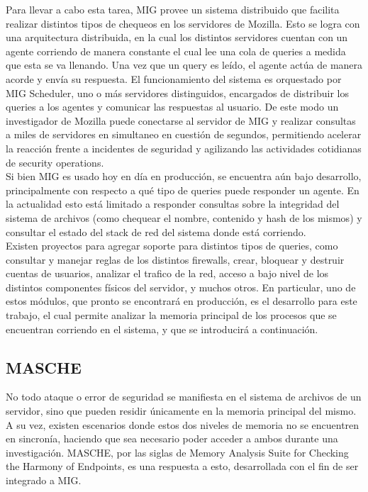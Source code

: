 Para llevar a cabo esta tarea, MIG provee un sistema distribuido que facilita
realizar distintos tipos de chequeos en los servidores de Mozilla. Esto se
logra con una arquitectura distribuida, en la cual los distintos servidores
cuentan con un agente corriendo de manera constante el cual lee una cola de
queries a medida que esta se va llenando. Una vez que un
query es leído, el agente actúa de manera acorde y envía su respuesta.
El funcionamiento del sistema es orquestado por MIG Scheduler, uno o
más servidores distinguidos, encargados de distribuir los queries a
los agentes y comunicar las respuestas al usuario. De este modo un investigador
de Mozilla puede conectarse al servidor de MIG y realizar consultas a miles de
servidores en simultaneo en cuestión de segundos, permitiendo acelerar la
reacción frente a incidentes de seguridad y agilizando las actividades
cotidianas de security operations.\\

Si bien MIG es usado hoy en día en producción, se encuentra aún bajo
desarrollo, principalmente con respecto a qué tipo de queries puede
responder un agente. En la actualidad esto está limitado a responder consultas
sobre la integridad del sistema de archivos (como chequear el nombre, contenido
y hash de los mismos) y consultar el estado del stack de red del sistema donde
está corriendo.\\

Existen proyectos para agregar soporte para distintos tipos de queries, como
consultar y manejar reglas de los distintos firewalls, crear, bloquear y
destruir cuentas de usuarios, analizar el trafico de la red, acceso a bajo
nivel de los distintos componentes físicos del servidor, y muchos otros. En
particular, uno de estos módulos, que pronto se encontrará en producción, es el
desarrollo para este trabajo, el cual permite analizar la memoria principal de
los procesos que se encuentran corriendo en el sistema, y que se introducirá a
continuación.\\

\subsection{MASCHE}

No todo ataque o error de seguridad se manifiesta en el sistema de archivos de
un servidor, sino que pueden residir únicamente en la memoria principal del
mismo. A su vez, existen escenarios donde estos dos niveles de memoria no se
encuentren en sincronía, haciendo que sea necesario poder acceder a ambos
durante una investigación. MASCHE, por las siglas de Memory Analysis Suite for
Checking the Harmony of Endpoints, es una respuesta a esto, desarrollada con el
fin de ser integrado a MIG.\\

